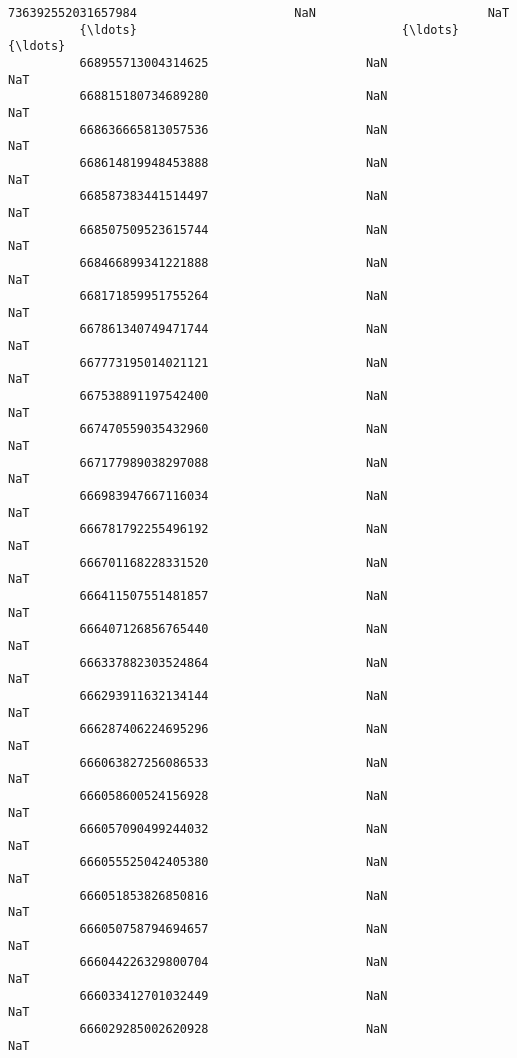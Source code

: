 \documentclass[11pt]{article}
\begin{document}
\begin{Verbatim}[commandchars=\\\{\}]
          736392552031657984                      NaN                        NaT   
          {\ldots}                                     {\ldots}                        {\ldots}   
          668955713004314625                      NaN                        NaT   
          668815180734689280                      NaN                        NaT   
          668636665813057536                      NaN                        NaT   
          668614819948453888                      NaN                        NaT   
          668587383441514497                      NaN                        NaT   
          668507509523615744                      NaN                        NaT   
          668466899341221888                      NaN                        NaT   
          668171859951755264                      NaN                        NaT   
          667861340749471744                      NaN                        NaT   
          667773195014021121                      NaN                        NaT   
          667538891197542400                      NaN                        NaT   
          667470559035432960                      NaN                        NaT   
          667177989038297088                      NaN                        NaT   
          666983947667116034                      NaN                        NaT   
          666781792255496192                      NaN                        NaT   
          666701168228331520                      NaN                        NaT   
          666411507551481857                      NaN                        NaT   
          666407126856765440                      NaN                        NaT   
          666337882303524864                      NaN                        NaT   
          666293911632134144                      NaN                        NaT   
          666287406224695296                      NaN                        NaT   
          666063827256086533                      NaN                        NaT   
          666058600524156928                      NaN                        NaT   
          666057090499244032                      NaN                        NaT   
          666055525042405380                      NaN                        NaT   
          666051853826850816                      NaN                        NaT   
          666050758794694657                      NaN                        NaT   
          666044226329800704                      NaN                        NaT   
          666033412701032449                      NaN                        NaT   
          666029285002620928                      NaN                        NaT   
          

\end{Verbatim}
\end{document}
